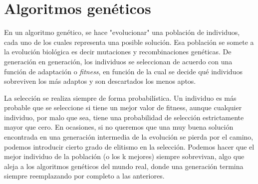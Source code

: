 \section{Algoritmos genéticos}

En un algoritmo genético, se hace "evolucionar" una población de individuos, cada uno de los cuales representa una posible solución. Esa población se somete a la evolución biológica es decir mutaciones y recombinaciones genéticas. De generación en generación, los individuos se seleccionan de acuerdo con una función de adaptación o \emph{fitness}, en función de la cual se decide qué individuos sobreviven los más adaptos y son descartados los menos aptos.

La selección se realiza siempre de forma probabilística. Un individuo es más probable que se seleccione si tiene un mejor valor de fitness, aunque cualquier individuo, por malo que sea, tiene una probabilidad de selección estrictamente mayor que cero. En ocasiones, si no queremos que una muy buena solución encontrada en una generación intermedia
de la evolución se pierda por el camino, podemos introducir cierto grado de elitismo en la selección. Podemos hacer que el mejor individuo de la población (o los k mejores) siempre sobrevivan, algo que aleja a los algoritmos genéticos del mundo real, donde una generación termina siempre reemplazando por completo a las anteriores.
